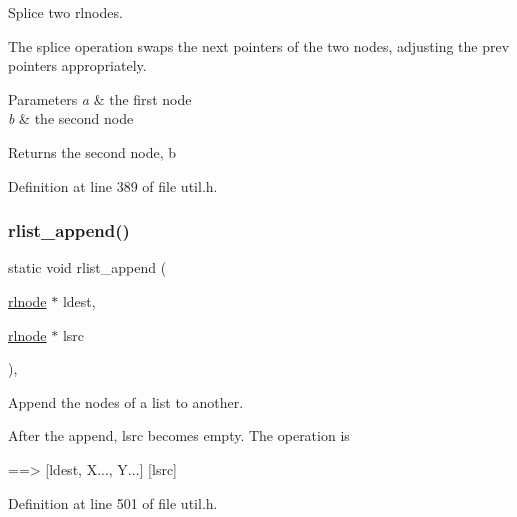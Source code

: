 Splice two rlnodes. 

The splice operation swaps the {\ttfamily next} pointers of the two nodes, adjusting the {\ttfamily prev} pointers appropriately.


\begin{DoxyParams}{Parameters}
{\em a} & the first node \\
\hline
{\em b} & the second node \\
\hline
\end{DoxyParams}
\begin{DoxyReturn}{Returns}
the second node, {\ttfamily b} 
\end{DoxyReturn}


Definition at line 389 of file util.\+h.

\mbox{\label{group__rlists_ga7f5989d7ec35645d6bbb1c15cd438532}} 
\subsubsection{\texorpdfstring{rlist\+\_\+append()}{rlist\_append()}}
{\footnotesize\ttfamily static void rlist\+\_\+append (\begin{DoxyParamCaption}\item[{\hyperlink{group__rlists_ga8f6244877f7ce2322c90525217ea6e7a}{rlnode} $\ast$}]{ldest,  }\item[{\hyperlink{group__rlists_ga8f6244877f7ce2322c90525217ea6e7a}{rlnode} $\ast$}]{lsrc }\end{DoxyParamCaption})\hspace{0.3cm}{\ttfamily [inline]}, {\ttfamily [static]}}



Append the nodes of a list to another. 

After the append, {\ttfamily lsrc} becomes empty. The operation is \begin{DoxyVerb}[ldest, X...] [lsrc, Y...]  ==> [ldest, X..., Y...]  [lsrc]
\end{DoxyVerb}
 

Definition at line 501 of file util.\+h.

\mbox{\label{group__rlists_gac02a33ca2f63b5dc5e9597a54da32cf4}} 
